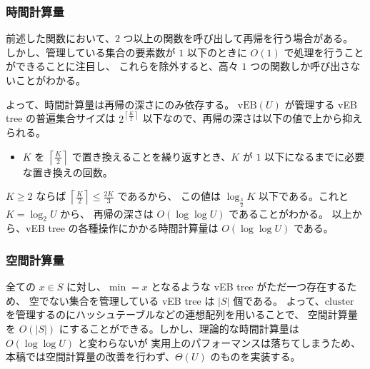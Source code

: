 \documentclass[dvipdfmx,a4j,10pt]{jarticle}
\begin{document}
\subsubsection{時間計算量}

前述した関数において、$2$ つ以上の関数を呼び出して再帰を行う場合がある。
しかし、管理している集合の要素数が $1$ 以下のときに $O(1)$ で処理を行うことができることに注目し、
これらを除外すると、高々 $1$ つの関数しか呼び出さないことがわかる。

よって、時間計算量は再帰の深さにのみ依存する。
$\mathrm{vEB}(U)$ が管理する vEB tree の普遍集合サイズは $2^{\left\lceil \frac{K}{2} \right\rceil}$ 以下なので、再帰の深さは以下の値で上から抑えられる。

\begin{itemize}
  \item $K$ を $\left\lceil \frac{K}{2} \right\rceil$ で置き換えることを繰り返すとき、$K$ が $1$ 以下になるまでに必要な置き換えの回数。
\end{itemize}

$K \geq 2$ ならば $\left\lceil \frac{K}{2} \right\rceil \leq \frac{2K}{3}$ であるから、
この値は $\log_{\frac{3}{2}}{K}$ 以下である。これと $K = \log_2{U}$ から、
再帰の深さは $O(\log \log U)$ であることがわかる。
以上から、vEB tree の各種操作にかかる時間計算量は $O(\log \log U)$ である。

\subsubsection{空間計算量}

全ての $x \in S$ に対し、$\min = x$ となるような vEB tree がただ一つ存在するため、
空でない集合を管理している vEB tree は $|S|$ 個である。
よって、$\mathrm{cluster}$ を管理するのにハッシュテーブルなどの連想配列を用いることで、
空間計算量を $O(|S|)$ にすることができる。しかし、理論的な時間計算量は $O(\log \log U)$ と変わらないが
実用上のパフォーマンスは落ちてしまうため、本稿では空間計算量の改善を行わず、$\Theta(U)$ のものを実装する。
\end{document}
